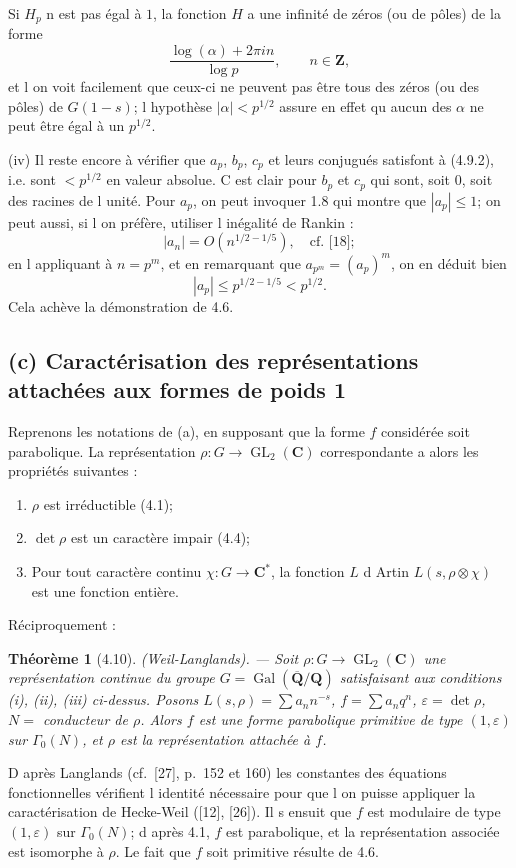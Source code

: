 \documentclass[11pt]{amsart}
\theoremstyle{plain}
\newtheorem{theoreme}{Théorème}[section]
\theoremstyle{definition}
\theoremstyle{remark}
\DeclareMathOperator{\Gal}{Gal}
\DeclareMathOperator{\GL}{GL}
\newcommand{\Q}{\mathbf{Q}}
\newcommand{\Z}{\mathbf{Z}}
\newcommand{\C}{\mathbf{C}}
\begin{document}
Si $H_p$ n est pas \'egal \`a $1$, la fonction $H$ a une infinit\'e de z\'eros (ou de p\^oles) de la forme
$$\frac{\log(\alpha) + 2\pi in}{\log p}, \qquad n \in \Z,$$
et l on voit facilement que ceux-ci ne peuvent pas \^etre tous des z\'eros (ou des p\^oles) de $G(1-s)$; l hypoth\`ese $|\alpha| < p^{1/2}$ assure en effet qu aucun des $\alpha$ ne peut \^etre \'egal \`a un $p^{1/2}$.

(iv) Il reste encore \`a v\'erifier que $a_p$, $b_p$, $c_p$ et leurs conjugu\'es satisfont \`a (4.9.2), i.e. sont $< p^{1/2}$ en valeur absolue. C est clair pour $b_p$ et $c_p$ qui sont, soit $0$, soit des racines de l unit\'e. Pour $a_p$, on peut invoquer 1.8 qui montre que $|a_p| \le 1$; on peut aussi, si l on pr\'ef\`ere, utiliser l in\'egalit\'e de Rankin :
$$|a_n| = O(n^{1/2 - 1/5}), \quad \text{cf.~[18]};$$
en l appliquant \`a $n = p^m$, et en remarquant que $a_{p^m} = (a_p)^m$, on en d\'eduit bien
$$|a_p| \le p^{1/2 - 1/5} < p^{1/2}.$$
Cela ach\`eve la d\'emonstration de 4.6.

\subsection*{(c) Caract\'erisation des repr\'esentations attach\'ees aux formes de poids 1}
Reprenons les notations de (a), en supposant que la forme $f$ consid\'er\'ee soit parabolique. La repr\'esentation $\rho : G \to \GL_2(\C)$ correspondante a alors les propri\'et\'es suivantes :
\begin{enumerate}
\item[(i)] $\rho$ est irr\'eductible (4.1);
\item[(ii)] $\det \rho$ est un caract\`ere impair (4.4);
\item[(iii)] Pour tout caract\`ere continu $\chi : G \to \C^*$, la fonction $L$ d Artin $L(s, \rho \otimes \chi)$ est une fonction enti\`ere.
\end{enumerate}
R\'eciproquement :
\begin{theoreme}[4.10]
(Weil-Langlands). --- Soit $\rho : G \to \GL_2(\C)$ une repr\'esentation continue du groupe $G = \Gal(\overline{\Q}/\Q)$ satisfaisant aux conditions (i), (ii), (iii) ci-dessus. Posons $L(s, \rho) = \sum a_n n^{-s}$, $f = \sum a_n q^n$, $\varepsilon = \det \rho$, $N =$ conducteur de $\rho$. Alors $f$ est une forme parabolique primitive de type $(1, \varepsilon)$ sur $\Gamma_0(N)$, et $\rho$ est la repr\'esentation attach\'ee \`a $f$.
\end{theoreme}

D apr\`es Langlands (cf.~[27], p.~152 et 160) les constantes des \'equations fonctionnelles v\'erifient l identit\'e n\'ecessaire pour que l on puisse appliquer la caract\'erisation de Hecke-Weil ([12], [26]). Il s ensuit que $f$ est modulaire de type $(1, \varepsilon)$ sur $\Gamma_0(N)$; d apr\`es 4.1, $f$ est parabolique, et la repr\'esentation associ\'ee est isomorphe \`a $\rho$. Le fait que $f$ soit primitive r\'esulte de 4.6.
\end{document}
